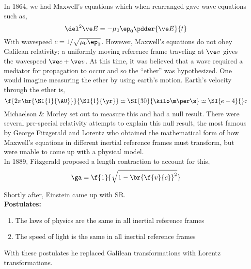 \documentclass{article}
\begin{document}
In 1864, we had Maxwell's equations which when rearranged gave wave equations such as,
\[ \del^2 \ve E = - \mu_0 \ep_0 \pdder{\ve E}{t} \]
With wavespeed $c = 1 / \sqrt{\mu_0 \ep_0}$. However, Maxwell's equations do not obey Galilean relativity; a uniformly moving reference frame traveling at $\ve v$ gives the wavespeed $\ve c + \ve v$. At this time, it was believed that a wave required a mediator for propagation to occur and so the ``ether'' was hypothesized. One would imagine measuring the ether by using earth's motion. Earth's velocity through the ether is,
\[ \f{2 \pi \br{\SI{1}{\AU}}}{\SI{1}{\yr}} \simeq \SI{30}{\kilo\m\per\s} \simeq \SI{e-4}{}\text{c} \]
Michaelson \& Morley set out to measure this and had a null result. There were several pre-special relativity attempts to explain this null result, the most famous by George Fitzgerald and Lorentz who obtained the mathematical form of how Maxwell's equations in different inertial reference frames must transform, but were unable to come up with a physical model.\\

In 1889, Fitzgerald proposed a length contraction to account for this,
\[ \ga = \f{1}{\sqrt{1 - \br{\f{v}{c}}^2}} \]

Shortly after, Einstein came up with SR.\\

\textbf{Postulates:}
\begin{enumerate}
    \item The laws of physics are the same in all inertial reference frames
    \item The speed of light is the same in all inertial reference frames
\end{enumerate}

With these postulates he replaced Galilean transformations with Lorentz transformations.
\end{document}

